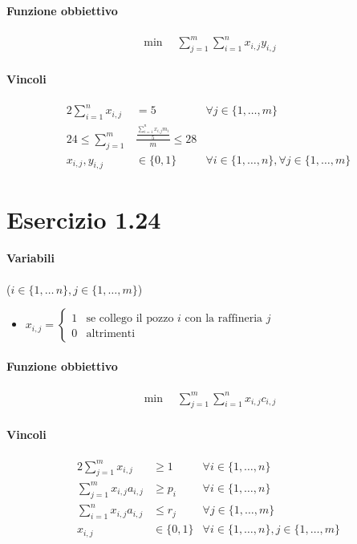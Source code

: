\documentclass{article}
\begin{document}
\paragraph{Funzione obbiettivo}
\begin{align*}
  \min \quad \sum_{j=1}^m \sum_{i=1}^n x_{i,j} y_{i,j}
\end{align*}

\paragraph{Vincoli}
\begin{alignat}{2}
  \sum_{i=1}^n x_{i,j} &= 5 \quad &\forall j \in \{1,\ldots,m\}\\
  24 \leq \sum_{j=1}^m &\frac{\frac{\sum_{i=1}^n x_{i,j} m_i}{5}}{m} \leq 28 \\
  x_{i,j}, y_{i,j} &\in \{0, 1\} \quad&\forall i \in \{1,\ldots,n\}, \forall j \in \{1,\ldots,m\}
\end{alignat}

\pagebreak
\section{Esercizio 1.24}

\paragraph{Variabili} ($i \in \{1,\ldots\,n\}, j \in \{1,\ldots,m\}$)
\begin{itemize}
  \item $x_{i,j} = \begin{cases}
      1 & \text{se collego il pozzo }i\text{ con la raffineria }j \\
      0 & \text{altrimenti}
  \end{cases}$
\end{itemize}

\paragraph{Funzione obbiettivo}
\begin{align*}
  \min \quad \sum_{j=1}^m \sum_{i=1}^n x_{i,j} c_{i,j}
\end{align*}

\paragraph{Vincoli}
\begin{alignat}{2}
  \sum_{j=1}^m x_{i,j} &\geq 1 &\forall i \in \{1,\ldots,n\} \\
  \sum_{j=1}^m x_{i,j} a_{i,j} &\geq p_i &\forall i \in \{1,\ldots,n\} \\
  \sum_{i=1}^n x_{i,j} a_{i,j} &\leq r_j &\forall j \in \{1,\ldots,m\} \\
  x_{i,j} &\in \{0,1\} &\forall i \in \{1,\ldots,n\}, j \in \{1,\ldots,m\}
\end{alignat}
\end{document}
